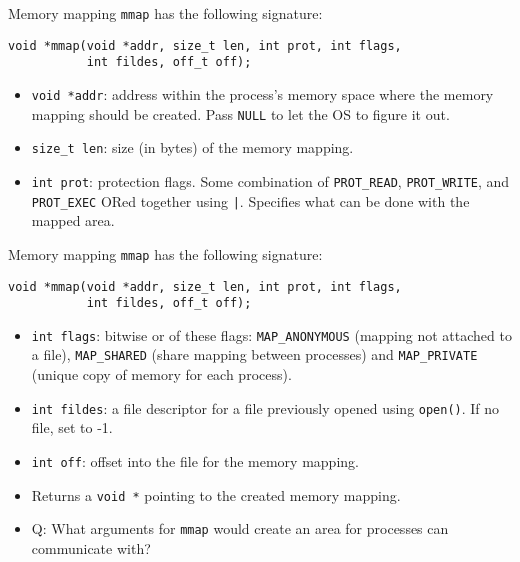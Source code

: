 \documentclass[notes]{beamer}
\begin{document}
\begin{frame}[fragile]{Memory mapping}
    \texttt{mmap} has the following signature:
\begin{verbatim}
void *mmap(void *addr, size_t len, int prot, int flags,
           int fildes, off_t off);
\end{verbatim}
    \begin{itemize}
	\item \texttt{void *addr}: address within the process's memory space where the memory mapping should be created. Pass \texttt{NULL} to let the OS to figure it out.
	\item \texttt{size\_t len}: size (in bytes) of the memory mapping.
	\item \texttt{int prot}: protection flags. Some combination of \texttt{PROT\_READ}, \texttt{PROT\_WRITE}, and \texttt{PROT\_EXEC} ORed together using \texttt{|}. Specifies what can be done with the mapped area.
    \end{itemize}
\end{frame}

\begin{frame}[fragile]{Memory mapping}
    \texttt{mmap} has the following signature:
\begin{verbatim}
void *mmap(void *addr, size_t len, int prot, int flags,
           int fildes, off_t off);
\end{verbatim}
    \begin{itemize}
	\item \texttt{int flags}: bitwise or of these flags: \texttt{MAP\_ANONYMOUS} (mapping not attached to a file), \texttt{MAP\_SHARED} (share mapping between processes) and \texttt{MAP\_PRIVATE} (unique copy of memory for each process).
	\item \texttt{int fildes}: a file descriptor for a file previously opened using \texttt{open()}. If no file, set to -1.
	\item \texttt{int off}: offset into the file for the memory mapping.
	\item Returns a \texttt{void *} pointing to the created memory mapping.
	\item Q: What arguments for \texttt{mmap} would create an area for processes can communicate with?
    \end{itemize}
\end{frame}
\end{document}
